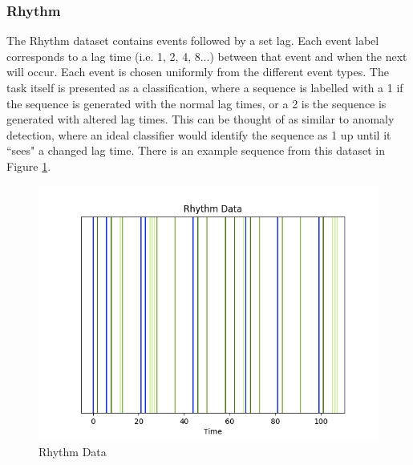 \subsubsection{Rhythm}
\label{sec:rhythm}
The Rhythm dataset contains events followed by a set lag. Each event label corresponds to a lag time (i.e. 1, 2, 4, 8...) between that event and when the next will occur. Each event is chosen uniformly from the different event types. The task itself is presented as a classification, where a sequence is labelled with a 1 if the sequence is generated with the normal lag times, or a 2 is the sequence is generated with altered lag times. This can be thought of as similar to anomaly detection, where an ideal classifier would identify the sequence as 1 up until it ``sees" a changed lag time. There is an example sequence from this dataset in Figure \ref{fig:rhythm}.
\begin{figure}
    \centering
    \includegraphics{figures/rhythm30.png}
    \caption{Rhythm Data}
    \label{fig:rhythm}
\end{figure}
